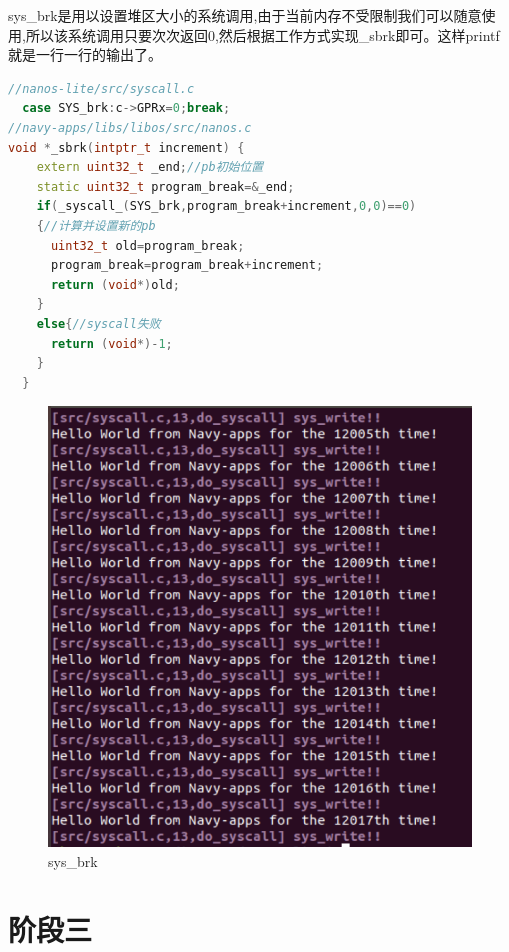 \documentclass[UTF8,a4paper,10pt]{ctexart}
\begin{document}
{{  sys\_brk是用以设置堆区大小的系统调用,由于当前内存不受限制我们可以随意使用,所以该系统调用只要次次返回0,然后根据工作方式实现\_sbrk即可。这样printf就是一行一行的输出了。
  \begin{lstlisting}[title=sysbrk,frame=trbl,language={C++}]
//nanos-lite/src/syscall.c
  case SYS_brk:c->GPRx=0;break;
//navy-apps/libs/libos/src/nanos.c
void *_sbrk(intptr_t increment) {
    extern uint32_t _end;//pb初始位置
    static uint32_t program_break=&_end;
    if(_syscall_(SYS_brk,program_break+increment,0,0)==0)
    {//计算并设置新的pb
      uint32_t old=program_break;
      program_break=program_break+increment;
      return (void*)old;
    }
    else{//syscall失败
      return (void*)-1;
    }
  }
  \end{lstlisting}  
\begin{figure}[H]
    \centering
    \includegraphics[scale=0.5]{fig/4.png}
    \caption{sys\_brk}
\end{figure}
}
\section{阶段三}
}
\end{document}

